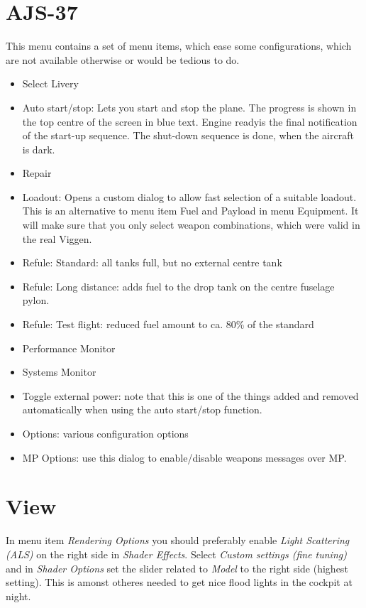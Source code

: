 \section{AJS-37}
This menu contains a set of menu items, which ease some configurations, which are not available otherwise or would be tedious to do.
\begin{itemize}
\item Select Livery
\item Auto start/stop: Lets you start and stop the plane. The progress is shown in the top centre of the screen in blue text. \glqq Engine ready\grqq is the final notification of the start-up sequence. The shut-down sequence is done, when the aircraft is dark.
\item Repair
\item Loadout: Opens a custom dialog to allow fast selection of a suitable loadout. This is an alternative to menu item Fuel and Payload in menu Equipment. It will make sure that you only select weapon combinations, which were valid in the real Viggen.
\item Refule: Standard: all tanks full, but no external centre tank
\item Refule: Long distance: adds fuel to the drop tank on the centre fuselage pylon.
\item Refule: Test flight: reduced fuel amount to ca. 80\% of the standard
\item Performance Monitor
\item Systems Monitor
\item Toggle external power: note that this is one of the things added and removed automatically when using the auto start/stop function.
\item Options: various configuration options
\item MP Options: use this dialog to enable/disable weapons messages over MP.
\end{itemize}

\section{View}
In menu item \emph{Rendering Options} you should preferably enable \emph{Light Scattering (ALS)} on the right side in \emph{Shader Effects}. Select \emph{Custom settings (fine tuning)} and in \emph{Shader Options} set the slider related to \emph{Model} to the right side (highest setting). This is amonst otheres needed to get nice flood lights in the cockpit at night.

